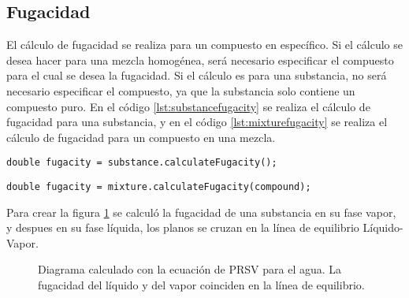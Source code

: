 \subsection{Fugacidad}\label{subsec:fugacity}
	
	El cálculo de fugacidad se realiza para un compuesto en específico. Si el cálculo se desea hacer para una mezcla homogénea, será necesario especificar el compuesto para el cual se desea la fugacidad. Si el cálculo es para una substancia, no será necesario especificar el compuesto, ya que la substancia solo contiene un compuesto puro. En el código \ref{lst:substancefugacity} se realiza el cálculo de fugacidad para una substancia, y en el código \ref{lst:mixturefugacity} se realiza el cálculo de fugacidad para un compuesto en una mezcla.

\begin{lstlisting}[label={lst:substancefugacity}, caption={Cálculo de la fugacidad para una substancia homogénea.}]
	double fugacity = substance.calculateFugacity();
\end{lstlisting}

\begin{lstlisting}[label={lst:mixturefugacity}, caption={Cálculo de la fugacidad para un compuesto en una mezcla. Es necesario indicar el objeto del tipo 'Substance' para el cual se desea calcular la fugacidad. Este compuesto debe formar parte de la mezcla. }]
	double fugacity = mixture.calculateFugacity(compound);
\end{lstlisting}

	Para crear la figura \ref{fig:fugacity} se calculó la fugacidad de una substancia en su fase vapor, y despues en su fase líquida, los planos se cruzan en la línea de equilibrio Líquido-Vapor.

\begin{figure}[!h]
	\centering
	\caption{Diagrama calculado con la ecuación de PRSV para el agua.
	La fugacidad del líquido y del vapor coinciden en la línea de equilibrio. }\label{fig:fugacity}
\end{figure}



